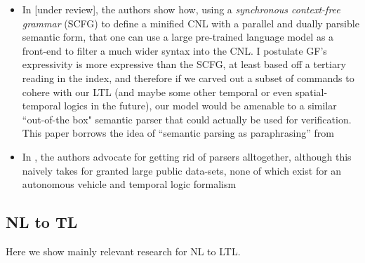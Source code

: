 \documentclass[a4paper, 11pt]{article}
\begin{document}
\begin{itemize}

\item In \cite{fewShotSem} [under review], the authors show how, using a \emph{synchronous
context-free grammar} (SCFG) to define a minified CNL with a parallel and dually
parsible semantic form, that one can use a large pre-trained language model as a front-end
to filter a much wider syntax into the CNL. I postulate GF's expressivity is
more expressive than the SCFG, at least based off a tertiary reading in the
index, and therefore if we carved out a subset of commands to cohere with our
LTL (and maybe some other temporal or even spatial-temporal logics in the
future), our model would be amenable to a similar ``out-of-the box" semantic
parser that could actually be used for verification. This paper borrows the idea
of ``semantic parsing as paraphrasing'' from  \cite{berant-liang-2014-semantic}

\item In \cite{dontParse}, the authors advocate for getting rid of parsers
  alltogether, although this naively takes for granted large public data-sets,
  none of which exist for an autonomous vehicle and temporal logic formalism

\end{itemize}

\subsection{NL to TL}

Here we show mainly relevant research for NL to LTL.
\end{document}
